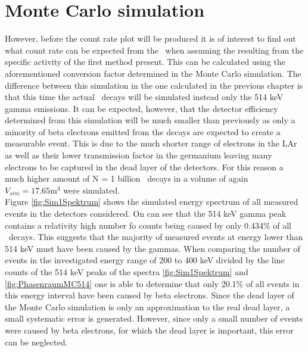 \documentclass[encoding=utf8,british]{tumphthesis}
\begin{document}
\section{Monte Carlo simulation}

However, before the count rate plot will be produced it is of interest to find out what count rate can be expected from the \Kr\ when assuming the resulting from the specific activity of the first method present.
This can be calculated using the aforementioned conversion factor determined in the Monte Carlo simulation.
The difference between this simulation in the one calculated in the previous chapter is that this time the actual \Kr\ decays will be simulated instead only the 514 keV gamma emissions.
It can be expected, however, that the detector efficiency determined from this simulation will be much smaller than previously as only a minority of beta electrons emitted from the decays are expected to create a measurable event.
This is due to the much shorter range of electrons in the LAr as well as their lower transmission factor in the germanium leaving many electrons to be captured in the dead layer of the detectors.
For this reason a much higher amount of N = 1 billion \Kr\ decays in a volume of again $V_{sim} = 17.65 \mathrm{m}^3$ were simulated.
\\

Figure \ref{fig:Sim1Spektrum} shows the simulated energy spectrum of all measured events in the detectors considered.
On can see that the 514 keV gamma peak contains a relativity high number fo counts being caused by only 0.434$\%$ of all \Kr\ decays.
This suggests that the majority of measured events at energy lower than 514 keV must have been caused by the gammas.
When comparing the number of events in the investigated energy range of 200 to 400 keV divided by the line counts of the 514 keV peaks of the spectra \ref{fig:Sim1Spektrum} and \ref{fig:PhasenraumMC514} one is able to determine that only 20.1$\%$ of all events in this energy interval have been caused by beta electrons.
Since the dead layer of the Monte Carlo simulation is only an approximation to the real dead layer, a small systematic error is generated. 
However, since only a small number of events were caused by beta electrons, for which the dead layer is important, this error can be neglected. 
\\
\end{document}
